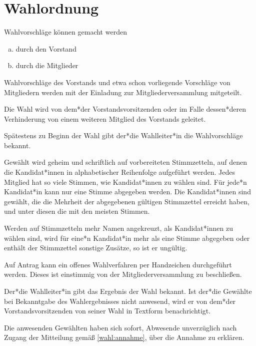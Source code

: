 \section{Wahlordnung}
\begin{wahl}

  Wahlvorschläge können gemacht werden
  \begin{enumerate}[(a)]
    \item durch den Vorstand
    \item durch die Mitglieder
  \end{enumerate}

  Wahlvorschläge des Vorstands und etwa schon vorliegende Vorschläge von Mitgliedern werden mit der Einladung zur Mitgliederversammlung mitgeteilt.

  Die Wahl wird von dem*der Vorstandsvorsitzenden oder im Falle dessen*deren Verhinderung von einem weiteren Mitglied des Vorstands geleitet.

  Spätestens zu Beginn der Wahl gibt der*die Wahlleiter*in die Wahlvorschläge bekannt.

  Gewählt wird geheim und schriftlich auf vorbereiteten Stimmzetteln, auf denen die Kandidat*innen in alphabetischer Reihenfolge aufgeführt werden. Jedes Mitglied hat so viele Stimmen, wie Kandidat*innen zu wählen sind. Für jede*n Kandidat*in kann nur eine Stimme abgegeben werden. Die Kandidat*innen sind gewählt, die die Mehrheit der abgegebenen gültigen Stimmzettel erreicht haben, und unter diesen die mit den meisten Stimmen.

  Werden auf Stimmzetteln mehr Namen angekreuzt, als Kandidat*innen zu wählen sind, wird für eine*n Kandidat*in mehr als eine Stimme abgegeben oder enthält der Stimmzettel sonstige Zusätze, so ist er ungültig.

  Auf Antrag kann ein offenes Wahlverfahren per Handzeichen durchgeführt werden. Dieses ist einstimmig von der Mitgliederversammlung zu beschließen.

  Der*die Wahlleiter*in gibt das Ergebnis der Wahl bekannt. Ist der*die Gewählte bei Bekanntgabe des Wahlergebnisses nicht anwesend, wird er von dem*der Vorstandsvorsitzenden von seiner Wahl in Textform benachrichtigt.
  \label{wahl:annahme}

  Die anwesenden Gewählten haben sich sofort, Abwesende unverzüglich nach Zugang der Mitteilung gemäß \ref{wahl:annahme}, über die Annahme zu erklären.

\end{wahl}

